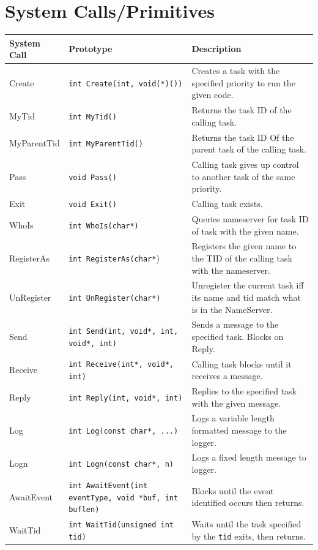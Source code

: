 \documentclass[12pt]{article}
\begin{document}
\section{System Calls/Primitives}
\begin{longtable}{|l|p{}|p{}|}
  \hline
  {\bf System Call} & {\bf Prototype} & {\bf Description} \\\hline
  Create & \texttt{int Create(int, void(*)())} & Creates a task with the specified priority to run the given code. \\\hline
  MyTid & \texttt{int MyTid()} & Returns the task ID of the calling task. \\\hline
  MyParentTid & \texttt{int MyParentTid()} & Returns the task ID Of the parent task of the calling task. \\\hline
  Pass & \texttt{void Pass()} & Calling task gives up control to another task of the same priority. \\\hline
  Exit & \texttt{void Exit()} & Calling task exists. \\\hline
  WhoIs & \texttt{int WhoIs(char*)} & Queries nameserver for task ID of task with the given name. \\\hline
  RegisterAs & \texttt{int RegisterAs(char*}) & Registers the given name to the TID of the calling task with the nameserver. \\\hline
  UnRegister & \texttt{int UnRegister(char*)} & Unregister the current task iff its name and tid match what is in the NameServer. \\\hline
  Send & \texttt{int Send(int, void*, int, void*, int)} & Sends a message to the specified task. Blocks on Reply. \\\hline
  Receive & \texttt{int Receive(int*, void*, int)} & Calling task blocks until it receives a message. \\\hline
  Reply & \texttt{int Reply(int, void*, int)} & Replies to the specified task with the given message. \\\hline
  Log & \texttt{int Log(const char*, ...)} & Logs a variable length formatted message to the logger. \\\hline
  Logn & \texttt{int Logn(const char*, n)} & Logs a fixed length message to logger. \\\hline
  AwaitEvent & \texttt{int AwaitEvent(int eventType, void *buf, int buflen)} & Blocks until the event identified occurs then returns. \\\hline
  WaitTid & \texttt{int WaitTid(unsigned int tid)} & Waits until the task specified by the \texttt{tid} exits, then returns. \\\hline

\end{longtable}
\end{document}
